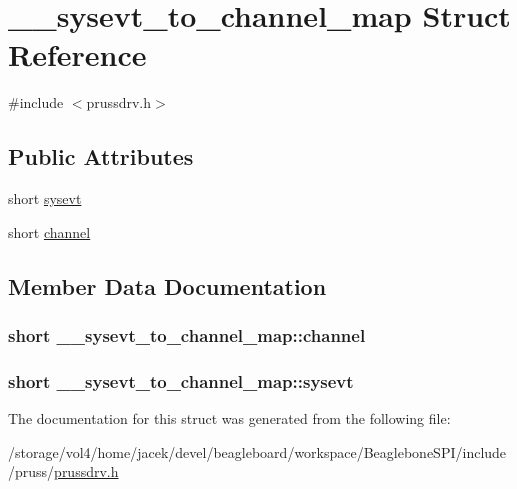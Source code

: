 \hypertarget{struct____sysevt__to__channel__map}{\section{\-\_\-\-\_\-sysevt\-\_\-to\-\_\-channel\-\_\-map Struct Reference}
\label{struct____sysevt__to__channel__map}
}


{\ttfamily \#include $<$prussdrv.\-h$>$}

\subsection*{Public Attributes}
\begin{DoxyCompactItemize}
\item 
short \hyperlink{struct____sysevt__to__channel__map_a5e77be482e90c245ccceee02e636fcfa}{sysevt}
\item 
short \hyperlink{struct____sysevt__to__channel__map_a1f3378ae547bef32f0117071e64d8312}{channel}
\end{DoxyCompactItemize}


\subsection{Member Data Documentation}
\hypertarget{struct____sysevt__to__channel__map_a1f3378ae547bef32f0117071e64d8312}{
\subsubsection[{channel}]{\setlength{\rightskip}{0pt plus 5cm}short \-\_\-\-\_\-sysevt\-\_\-to\-\_\-channel\-\_\-map\-::channel}}\label{struct____sysevt__to__channel__map_a1f3378ae547bef32f0117071e64d8312}
\hypertarget{struct____sysevt__to__channel__map_a5e77be482e90c245ccceee02e636fcfa}{
\subsubsection[{sysevt}]{\setlength{\rightskip}{0pt plus 5cm}short \-\_\-\-\_\-sysevt\-\_\-to\-\_\-channel\-\_\-map\-::sysevt}}\label{struct____sysevt__to__channel__map_a5e77be482e90c245ccceee02e636fcfa}


The documentation for this struct was generated from the following file\-:\begin{DoxyCompactItemize}
\item 
/storage/vol4/home/jacek/devel/beagleboard/workspace/\-Beaglebone\-S\-P\-I/include/pruss/\hyperlink{prussdrv_8h}{prussdrv.\-h}\end{DoxyCompactItemize}
